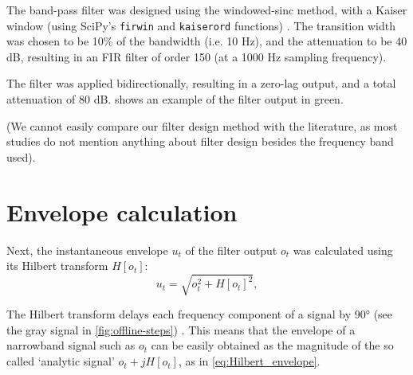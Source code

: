 The band-pass filter was designed using the windowed-sinc method, with a Kaiser window (using SciPy's \texttt{firwin} and \texttt{kaiserord} functions) \cite{Roelandts2016,Jones2018a}. The transition width was chosen to be 10\% of the bandwidth (i.e. 10 Hz), and the attenuation to be 40 dB, resulting in an FIR filter of order 150 (at a 1000 Hz sampling frequency).

The filter was applied bidirectionally, resulting in a zero-lag output, and a total attenuation of 80 dB.  shows an example of the filter output in green.

(We cannot easily compare our filter design method with the literature, as most studies do not mention anything about filter design besides the frequency band used).



\section{Envelope calculation}

Next, the instantaneous envelope $u_t$ of the filter output $o_t$ was calculated using its Hilbert transform\footnotemark{} $H[o_t]$:
%
\begin{equation}
\label{eq:Hilbert_envelope}
u_t = \sqrt{o_t^2 + H[o_t]^2},
\end{equation}


The Hilbert transform delays each frequency component of a signal by 90\si{\degree} (see the gray signal in \cref{fig:offline-steps})  \cite{Lyons2010}. This means that the envelope of a narrowband signal such as $o_t$ can be easily obtained as the magnitude of the so called `analytic signal' $o_t + j H[o_t]$, as in \cref{eq:Hilbert_envelope}.\footnotemark{}


